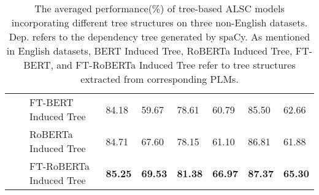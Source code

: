 \documentclass[11pt]{article}
\begin{document}
\begin{table*}[tp]
\begin{tabular}{m{2cm}m{2cm}m{4.75cm}m{1.15cm}<{\centering}m{1.15cm}<{\centering}m{1.15cm}<{\centering}m{1.15cm}<{\centering}m{1.15cm}<{\centering}m{1.15cm}<{\centering}}
                           &                                           & FT-BERT Induced Tree            & 84.18                     & 59.67                      & 78.61                       & 60.79                    & 85.50                   & 62.66          \\
                           &                                           & RoBERTa Induced Tree            & 84.71                     & 67.60                      & 78.15                       & 61.10                    & 86.81                   & 61.88          \\
                           &                                           & FT-RoBERTa Induced Tree         & \textbf{85.25}            & \textbf{69.53}             & \textbf{81.38}              & \textbf{66.97}           & \textbf{87.37}          & \textbf{65.30} \\
    \bottomrule
  \end{tabular}
  \caption{The averaged performance(\%) of tree-based ALSC models incorporating different tree structures on three non-English datasets.   Dep. refers to the dependency tree generated by spaCy. As mentioned in English datasets, BERT Induced Tree, RoBERTa Induced Tree, FT-BERT, and FT-RoBERTa Induced Tree refer to tree structures extracted from corresponding PLMs.}
  \label{tb:non_eng}
\end{table*}
\end{document}
